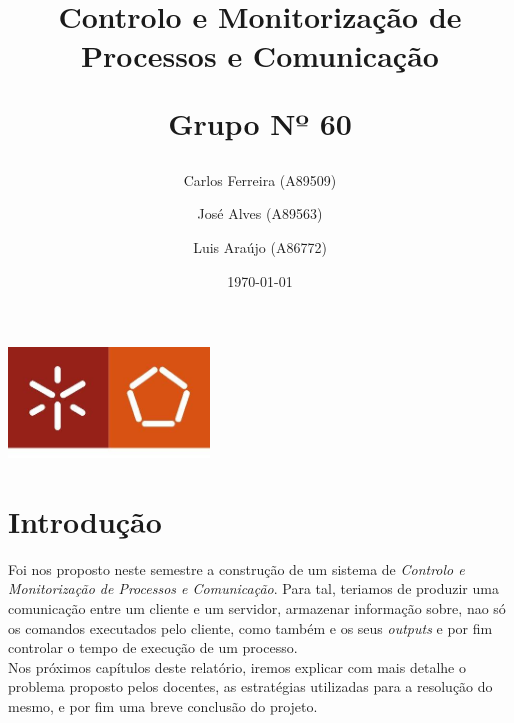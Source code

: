 \documentclass[a4paper]{report}
\begin{document}
\title{\textbf {Controlo e Monitorização de Processos e Comunicação}\par\vspace{1cm}
\large Grupo Nº 60}
\author{Carlos Ferreira (A89509) \and José Alves (A89563) \and Luis Araújo (A86772)\vspace{2.5cm}}
\date{\today}

\begin{center}
    \begin{minipage}{0.9\linewidth}
        \centering
        \includegraphics[width=0.4\textwidth]{eng.jpeg}\par\vspace{1cm}
        \vspace{1.5cm}
        \href{https://www.uminho.pt/PT}
        {\color{black}{\scshape\LARGE Universidade do Minho}} \par
        \vspace{1cm}
        \href{https://www.di.uminho.pt/}
        {\color{black}{\scshape\Large Departamento de Informática}} \par
        \vspace{1.5cm}
        \maketitle
    \end{minipage}
\end{center}

\tableofcontents

\pagebreak

\chapter{Introdução}\label{chap:Introdução}
Foi nos proposto neste semestre a construção de um sistema de \textit{Controlo e Monitorização de Processos e Comunicação}. Para tal, teriamos de produzir uma comunicação entre um cliente e um servidor, armazenar informação sobre, nao só os comandos executados pelo cliente, como também e os seus \textit{outputs} e por fim controlar o tempo de execução de um processo.\\
Nos próximos capítulos deste relatório, iremos explicar com mais detalhe o problema proposto pelos docentes, as estratégias utilizadas para a resolução do mesmo, e por fim uma breve conclusão do projeto. 
\end{document}
